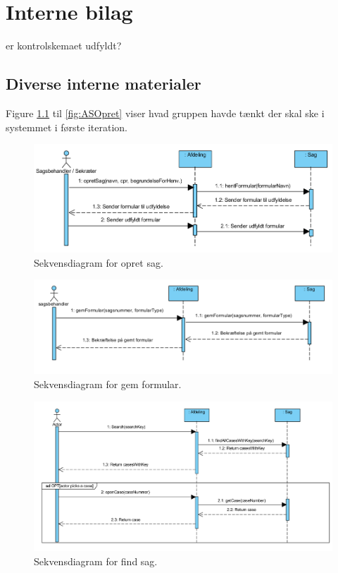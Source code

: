 
\chapter{Interne bilag}
er kontrolskemaet udfyldt?





\newpage
\section{Diverse interne materialer}

Figure \ref{fig:OpretSag} til \ref{fig:ASOpret} viser hvad gruppen havde tænkt der skal ske i systemmet i første iteration. \\

\begin{figure}[hb]
  \includegraphics[width=\linewidth]{./PNG/sekDiaOpretSag.PNG} 
  \caption{Sekvensdiagram for opret sag.}
  \label{fig:OpretSag}
\end{figure}

\begin{figure}[hb]
  \includegraphics[width=\linewidth]{./PNG/sekDiaGemFormular.PNG} 
  \caption{Sekvensdiagram for gem formular.}
  \label{fig:GemForm}
\end{figure}

\begin{figure}[hb]
  \includegraphics[width=\linewidth]{./PNG/sekDiaFindSag.PNG} 
  \caption{Sekvensdiagram for find sag.}
  \label{fig:FindSag}
\end{figure}


